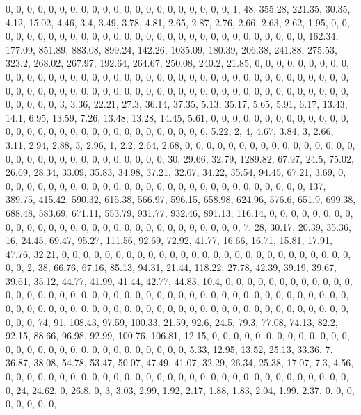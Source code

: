 \documentclass[
]{article}
\begin{document}
0, 0, 0, 0, 0, 0, 0, 0, 0, 0, 0, 0, 0, 0, 0, 0, 0, 0, 0, 0, 0, 1, 48,
355.28, 221.35, 30.35, 4.12, 15.02, 4.46, 3.4, 3.49, 3.78, 4.81, 2.65,
2.87, 2.76, 2.66, 2.63, 2.62, 1.95, 0, 0, 0, 0, 0, 0, 0, 0, 0, 0, 0, 0,
0, 0, 0, 0, 0, 0, 0, 0, 0, 0, 0, 0, 0, 0, 0, 0, 0, 0, 162.34, 177.09,
851.89, 883.08, 899.24, 142.26, 1035.09, 180.39, 206.38, 241.88, 275.53,
323.2, 268.02, 267.97, 192.64, 264.67, 250.08, 240.2, 21.85, 0, 0, 0, 0,
0, 0, 0, 0, 0, 0, 0, 0, 0, 0, 0, 0, 0, 0, 0, 0, 0, 0, 0, 0, 0, 0, 0, 0,
0, 0, 0, 0, 0, 0, 0, 0, 0, 0, 0, 0, 0, 0, 0, 0, 0, 0, 0, 0, 0, 0, 0, 0,
0, 0, 0, 0, 0, 0, 0, 0, 0, 0, 0, 0, 0, 0, 0, 0, 0, 0, 0, 0, 0, 0, 0, 0,
0, 0, 3, 3.36, 22.21, 27.3, 36.14, 37.35, 5.13, 35.17, 5.65, 5.91, 6.17,
13.43, 14.1, 6.95, 13.59, 7.26, 13.48, 13.28, 14.45, 5.61, 0, 0, 0, 0,
0, 0, 0, 0, 0, 0, 0, 0, 0, 0, 0, 0, 0, 0, 0, 0, 0, 0, 0, 0, 0, 0, 0, 0,
0, 0, 0, 6, 5.22, 2, 4, 4.67, 3.84, 3, 2.66, 3.11, 2.94, 2.88, 3, 2.96,
1, 2.2, 2.64, 2.68, 0, 0, 0, 0, 0, 0, 0, 0, 0, 0, 0, 0, 0, 0, 0, 0, 0,
0, 0, 0, 0, 0, 0, 0, 0, 0, 0, 0, 0, 0, 0, 30, 29.66, 32.79, 1289.82,
67.97, 24.5, 75.02, 26.69, 28.34, 33.09, 35.83, 34.98, 37.21, 32.07,
34.22, 35.54, 94.45, 67.21, 3.69, 0, 0, 0, 0, 0, 0, 0, 0, 0, 0, 0, 0, 0,
0, 0, 0, 0, 0, 0, 0, 0, 0, 0, 0, 0, 0, 0, 0, 0, 137, 389.75, 415.42,
590.32, 615.38, 566.97, 596.15, 658.98, 624.96, 576.6, 651.9, 699.38,
688.48, 583.69, 671.11, 553.79, 931.77, 932.46, 891.13, 116.14, 0, 0, 0,
0, 0, 0, 0, 0, 0, 0, 0, 0, 0, 0, 0, 0, 0, 0, 0, 0, 0, 0, 0, 0, 0, 0, 0,
0, 0, 0, 7, 28, 30.17, 20.39, 35.36, 16, 24.45, 69.47, 95.27, 111.56,
92.69, 72.92, 41.77, 16.66, 16.71, 15.81, 17.91, 47.76, 32.21, 0, 0, 0,
0, 0, 0, 0, 0, 0, 0, 0, 0, 0, 0, 0, 0, 0, 0, 0, 0, 0, 0, 0, 0, 0, 0, 0,
0, 0, 2, 38, 66.76, 67.16, 85.13, 94.31, 21.44, 118.22, 27.78, 42.39,
39.19, 39.67, 39.61, 35.12, 44.77, 41.99, 41.44, 42.77, 44.83, 10.4, 0,
0, 0, 0, 0, 0, 0, 0, 0, 0, 0, 0, 0, 0, 0, 0, 0, 0, 0, 0, 0, 0, 0, 0, 0,
0, 0, 0, 0, 0, 0, 0, 0, 0, 0, 0, 0, 0, 0, 0, 0, 0, 0, 0, 0, 0, 0, 0, 0,
0, 0, 0, 0, 0, 0, 0, 0, 0, 0, 0, 0, 0, 0, 0, 0, 0, 0, 0, 0, 0, 0, 0, 0,
0, 0, 0, 0, 0, 0, 74, 91, 108.43, 97.59, 100.33, 21.59, 92.6, 24.5,
79.3, 77.08, 74.13, 82.2, 92.15, 88.66, 96.98, 92.99, 100.76, 106.81,
12.15, 0, 0, 0, 0, 0, 0, 0, 0, 0, 0, 0, 0, 0, 0, 0, 0, 0, 0, 0, 0, 0, 0,
0, 0, 0, 0, 0, 0, 0, 0, 5.33, 12.95, 13.52, 25.13, 33.36, 7, 36.87,
38.08, 54.78, 53.47, 50.07, 47.49, 41.07, 32.29, 26.34, 25.38, 17.07,
7.3, 4.56, 0, 0, 0, 0, 0, 0, 0, 0, 0, 0, 0, 0, 0, 0, 0, 0, 0, 0, 0, 0,
0, 0, 0, 0, 0, 0, 0, 0, 0, 0, 0, 0, 0, 24, 24.62, 0, 26.8, 0, 3, 3.03,
2.99, 1.92, 2.17, 1.88, 1.83, 2.04, 1.99, 2.37, 0, 0, 0, 0, 0, 0, 0, 0,
\end{document}
